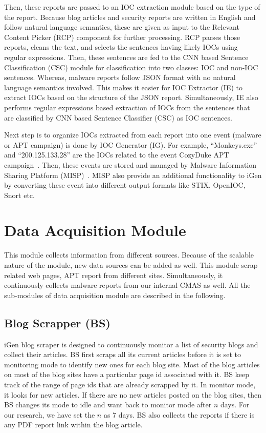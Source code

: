  Then, these reports are passed to an IOC extraction module based on the type of the report. Because blog articles and security reports are written in English and follow natural language semantics, these are given as input to the Relevant Content Picker (RCP) component for further processing. RCP parses those reports, cleans the text, and selects the sentences having likely IOCs using regular expressions. Then, these sentences are fed to the CNN based Sentence Classification (CSC) module for classification into two classes: IOC and non-IOC sentences.  Whereas, malware reports follow JSON format with no natural language semantics involved. This makes it easier for IOC Extractor (IE) to extract IOCs based on the structure of the JSON report. Simultaneously, IE also performs regular expressions based extraction of IOCs from the sentences that are classified by CNN based Sentence Classifier (CSC) as IOC sentences.    

Next step is to organize IOCs extracted from each report into one event (malware or APT campaign) is done by IOC Generator (IG). For example, ``Monkeys.exe'' and ``200.125.133.28'' are the IOCs related to the event CozyDuke APT campaign~\cite{cozyduke}. Then, these events are stored and managed by Malware Information Sharing Platform (MISP)~\cite{misp}. MISP also provide an additional functionality to iGen by converting these event into different output formats like STIX, OpenIOC, Snort etc. 
    


\section{Data Acquisition Module}
This module collects information from different sources. Because of the scalable nature of the module, new data sources can be added as well. This module scrap related web pages, APT report from different sites. Simultaneously, it continuously collects malware reports from our internal CMAS as well. All the sub-modules of data acquisition module are described in the following.

\subsection{Blog Scrapper (BS)}
iGen blog scraper is designed to continuously monitor a list of security blogs and collect their articles. BS first scraps all its current articles before it is set to monitoring mode to identify new ones for each blog site. Most of the blog articles on most of the blog sites have a particular page id associated with it. BS keep track of the range of page ids that are already scrapped by it. In monitor mode, it looks for new articles. If there are no new articles posted on the blog sites, then BS changes its mode to idle and want back to monitor mode after $n$ days. For our research, we have set the $n$ as 7 days. BS also collects the reports if there is any PDF report link within the blog article.



